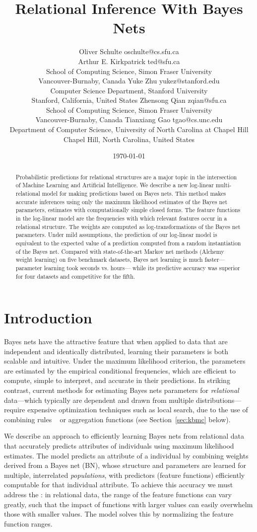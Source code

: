 \documentclass[twoside,11pt]{article}
\title{Relational Inference With Bayes Nets}
\author{\name Oliver Schulte \email oschulte@cs.sfu.ca \\
       \name  Arthur E. Kirkpatrick \email ted@sfu.ca \\
       \addr School of Computing Science, Simon Fraser University\\
		Vancouver-Burnaby, Canada 
       \AND
       \name Yuke Zhu \email yukez@stanford.edu \\
       \addr Computer Science Department, Stanford University\\
		Stanford, California, United States 
       \AND
       \name Zhensong Qian \email zqian@sfu.ca \\
       \addr School of Computing Science, Simon Fraser University\\
		Vancouver-Burnaby, Canada 
		\AND
       \name Tianxiang Gao \email tgao@cs.unc.edu \\
       \addr Department of Computer Science, University of North Carolina at Chapel Hill\\
		Chapel Hill, North Carolina, United States 
		    }
\date{\today}
\begin{document}
\maketitle



\begin{abstract} Probabilistic predictions for relational structures are a major topic in the intersection of Machine Learning and Artificial Intelligence. We describe a new log-linear multi-relational model for making predictions based on Bayes nets. This method makes accurate inferences using only the maximum likelihood estimates of the Bayes net parameters, estimates with computationally simple closed forms. The feature functions in the log-linear model are the frequencies with which relevant features occur in a relational structure. The weights are computed as log-transformations of the Bayes net parameters. Under mild assumptions, the prediction of our log-linear model is equivalent to the expected value of a prediction computed from a random instantiation of the Bayes net. Compared with state-of-the-art Markov net methods (Alchemy weight learning) on five benchmark datasets, Bayes net learning is much faster---parameter learning took seconds vs. hours--- while its predictive accuracy was superior for four datasets and competitive for the fifth.
\end{abstract}


 \section{Introduction} \label{sec:intro}
Bayes nets have the attractive feature that when applied to
data that are independent and identically distributed, learning their parameters is both scalable and intuitive.
Under the maximum likelihood criterion, the parameters are estimated by the empirical conditional frequencies, which are efficient to compute, simple to interpret, and accurate in their predictions.
In striking contrast, current methods for estimating Bayes nets 
parameters
for {\em relational} data---which typically are dependent and drawn from multiple distributions---require expensive optimization techniques such as
local search, due to the use of combining rules
~\cite{Natarajan2009,Kersting2007} or aggregation functions \cite{Getoor2007c} (see Section~\ref{sec:kbmc} below).

We describe an approach to efficiently learning Bayes nets from relational data that accurately predicts attributes of individuals using maximum likelihood estimates. The model predicts an attribute of a individual by combining weights derived from a Bayes net (BN), whose structure and parameters are learned for multiple, interrelated \emph{populations}, with predictors (feature functions) efficiently computable for that individual attribute.  
To achieve this accuracy we must address the : in relational data, the range of the feature functions can vary greatly, such that the impact of functions with larger values can easily overwhelm those with smaller values. The model solves this by normalizing the feature function ranges.
\end{document}
